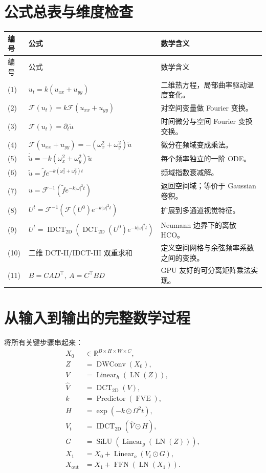 \documentclass[UTF8,12pt,a4paper,fontset=none]{ctexart}
\numberwithin{equation}{section}
\newcommand{\R}{\mathbb{R}}
\newcommand{\F}{\mathcal{F}}
\newcommand{\IFT}{\mathcal{F}^{-1}}
\newcommand{\DCT}{\operatorname{DCT}_{2\mathrm{D}}}
\newcommand{\IDCT}{\operatorname{IDCT}_{2\mathrm{D}}}
\newcommand{\pd}{\partial}
\newcommand{\SiLU}{\operatorname{SiLU}}
\newcommand{\LN}{\operatorname{LN}}
\newcommand{\DWConv}{\operatorname{DWConv}}
\begin{document}
\section{公式总表与维度检查}

\begin{longtable}{p{1.15cm}p{6.2cm}p{8.2cm}}
\toprule
编号 & 公式 & 数学含义\\
\midrule
\endfirsthead
\toprule
编号 & 公式 & 数学含义\\
\midrule
\endhead
(1) & $u_t=k(u_{xx}+u_{yy})$ & 二维热方程，局部曲率驱动温度变化。\\
(2) & $\F(u_t)=k\F(u_{xx}+u_{yy})$ & 对空间变量做 Fourier 变换。\\
(3) & $\F(u_t)=\pd_t\widetilde u$ & 时间微分与空间 Fourier 变换交换。\\
(4) & $\F(u_{xx}+u_{yy})=-(\omega_x^2+\omega_y^2)\widetilde u$ & 微分在频域变成乘法。\\
(5) & $\dot{\widetilde u}=-k(\omega_x^2+\omega_y^2)\widetilde u$ & 每个频率独立的一阶 ODE。\\
(6) & $\widetilde u=\widetilde f e^{-k(\omega_x^2+\omega_y^2)t}$ & 频域指数衰减解。\\
(7) & $u=\IFT(\widetilde f e^{-k|\omega|^2t})$ & 返回空间域；等价于 Gaussian 卷积。\\
(8) & $U^t=\IFT(\F(U^0)e^{-k|\omega|^2t})$ & 扩展到多通道视觉特征。\\
(9) & $U^t=\IDCT(\DCT(U^0)e^{-k|\omega|^2t})$ & Neumann 边界下的离散 HCO。\\
(10) & 二维 DCT-II/IDCT-III 双重求和 & 定义空间网格与余弦频率系数之间的变换。\\
(11) & $B=CAD^{\top},\ A=C^{\top}BD$ & GPU 友好的可分离矩阵乘法实现。\\
\bottomrule
\end{longtable}

\section{从输入到输出的完整数学过程}

将所有关键步骤串起来：
\begin{align}
  X_0&\in\R^{B\times H\times W\times C},\\
  Z&=\DWConv(X_0),\\
  V&=\operatorname{Linear}_h(\LN(Z)),\\
  \widehat V&=\DCT(V),\\
  k&=\operatorname{Predictor}(\operatorname{FVE}),\\
  H&=\exp(-k\odot\Omega^2t),\\
  V_t&=\IDCT(\widehat V\odot H),\\
  G&=\SiLU(\operatorname{Linear}_g(\LN(Z))),\\
  X_1&=X_0+\operatorname{Linear}_o(V_t\odot G),\\
  X_{\mathrm{out}}&=X_1+\operatorname{FFN}(\LN(X_1)).
\end{align}
\end{document}
